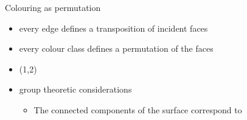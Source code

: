 \begin{frame}{Colouring as permutation}
{        \begin{itemize}
            \item<6->[$\leadsto$] every edge defines a transposition of incident faces
            \item<9->[$\leadsto$] every colour class defines a permutation of the faces
            \item<7-> \textcolor{\colB}{(1,2)}
            \item<12->[$\leadsto$] group theoretic considerations
                \begin{itemize}
                    \item<13-> The connected components of the surface correspond to 
                \end{itemize}
        \end{itemize}
    }
\end{frame}
         

